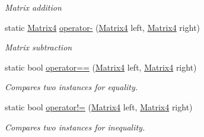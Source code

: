 \begin{DoxyCompactItemize}
\begin{DoxyCompactList}\small\item\em Matrix addition \end{DoxyCompactList}\item 
static \hyperlink{struct_open_t_k_1_1_matrix4}{Matrix4} \hyperlink{struct_open_t_k_1_1_matrix4_a50ef7db5d3733084cb67ba58677f70bb}{operator-\/} (\hyperlink{struct_open_t_k_1_1_matrix4}{Matrix4} left, \hyperlink{struct_open_t_k_1_1_matrix4}{Matrix4} right)
\begin{DoxyCompactList}\small\item\em Matrix subtraction \end{DoxyCompactList}\item 
static bool \hyperlink{struct_open_t_k_1_1_matrix4_aad4f598f135e44f6cd851c860577ac98}{operator==} (\hyperlink{struct_open_t_k_1_1_matrix4}{Matrix4} left, \hyperlink{struct_open_t_k_1_1_matrix4}{Matrix4} right)
\begin{DoxyCompactList}\small\item\em Compares two instances for equality. \end{DoxyCompactList}\item 
static bool \hyperlink{struct_open_t_k_1_1_matrix4_af9af6d65d9fbe574073da3d8a6fa817a}{operator!=} (\hyperlink{struct_open_t_k_1_1_matrix4}{Matrix4} left, \hyperlink{struct_open_t_k_1_1_matrix4}{Matrix4} right)
\begin{DoxyCompactList}\small\item\em Compares two instances for inequality. \end{DoxyCompactList}\end{DoxyCompactItemize}

